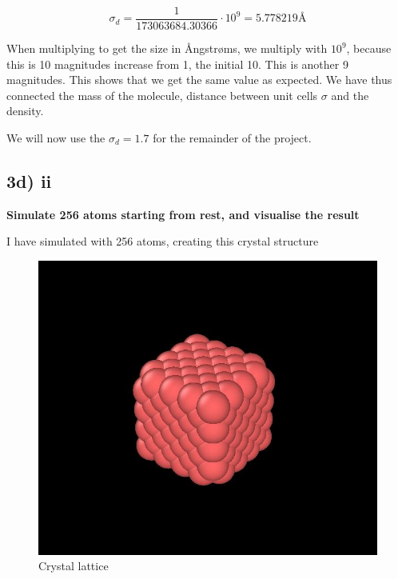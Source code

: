 \begin{equation}
\sigma_d = \frac{1}{173063684.30366} \cdot  10^{9} = 5.778219 Å
\end{equation}


When multiplying to get the size in Ångstrøms, we multiply with $10^9$, because this is 10 magnitudes increase from 1, the initial 10. This is another 9 magnitudes. This shows that we get the same value as expected. We have thus connected the mass of the molecule, distance between unit cells $\sigma$ and the density.

We will now use the $\sigma_d = 1.7 $ for the remainder of the project.



\subsection*{3d) ii}
\textbf{Simulate 256 atoms starting from rest, and visualise the result}

I have simulated with 256 atoms, creating this crystal structure

\begin{figure}[h!]
        \centering 
        \includegraphics[scale=0.6]{./py/3di_1_ovito.jpg} 
        \caption{Crystal lattice }
        \label{fig:3di_1}
\end{figure}


